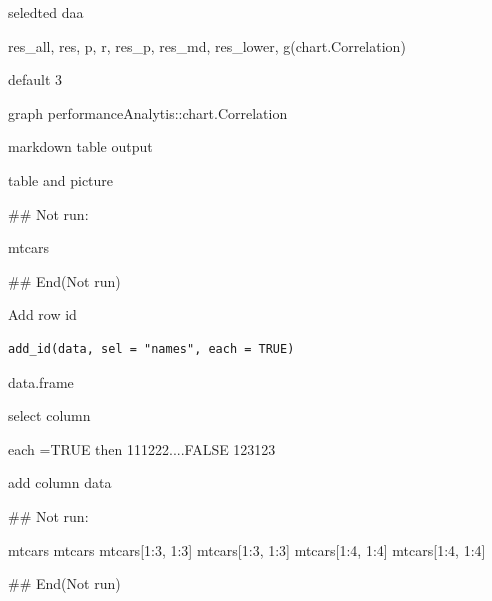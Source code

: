 \documentclass[a4paper]{book}
\begin{document}
%
\begin{Arguments}
\begin{ldescription}
\item[\code{selectdata}] seledted daa

\item[\code{type}] res\_all, res, p, r, res\_p, res\_md, res\_lower, g(chart.Correlation)

\item[\code{digits}] default 3

\item[\code{plot}] graph performanceAnalytis::chart.Correlation

\item[\code{md}] markdown table output
\end{ldescription}
\end{Arguments}
%
\begin{Value}
table and picture
\end{Value}
%
\begin{Examples}
\begin{ExampleCode}

\#\# Not run: 

mtcars%

## End(Not run)
\end{ExampleCode}
\end{Examples}
%
\begin{Description}
Add row id
\end{Description}
%
\begin{Usage}
\begin{verbatim}
add_id(data, sel = "names", each = TRUE)
\end{verbatim}
\end{Usage}
%
\begin{Arguments}
\begin{ldescription}
\item[\code{data}] data.frame

\item[\code{sel}] select column

\item[\code{each}] each =TRUE then 111222....FALSE 123123
\end{ldescription}
\end{Arguments}
%
\begin{Value}
add column data
\end{Value}
%
\begin{Examples}
\begin{ExampleCode}

\#\# Not run: 

mtcars %
mtcars %
mtcars[1:3, 1:3] %
mtcars[1:3, 1:3] %
mtcars[1:4, 1:4] %
mtcars[1:4, 1:4] %




## End(Not run)
\end{ExampleCode}
\end{Examples}
\end{document}
